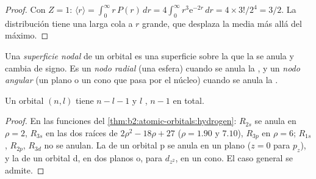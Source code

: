 \begin{proof}
Con $Z = 1$: $\langle r\rangle = \int_0^\infty r\,P(r)\,dr = 4\int_0^\infty r^3\mathrm e^{-2r}
\,dr = 4 \times 3!/2^4 = 3/2$. La distribución tiene una larga cola a $r$ grande,
que desplaza la media más allá del máximo.
\end{proof}

\begin{definition}[Nodos]\label{def:b2:atomic-orbitals:node}
Una \emph{superficie nodal} de un orbital es una superficie sobre la que
la  se anula y cambia de signo. Es un \emph{nodo radial}
(una esfera) cuando se anula la , y un \emph{nodo
angular} (un plano o un cono que pasa por el núcleo) cuando se anula la .
\end{definition}

\begin{proposition}\label{prop:b2:atomic-orbitals:nodes}
Un orbital $(n, l)$ tiene $n - l - 1$  y $l$ , $n - 1$ en
total.
\end{proposition}

\begin{proof}
En las funciones del \cref{thm:b2:atomic-orbitals:hydrogen}: $R_{2s}$ se anula en
$\rho = 2$, $R_{3s}$ en las dos raíces de $2\rho^2 - 18\rho + 27$ ($\rho = 1.90$ y $7.10$),
$R_{3p}$ en $\rho = 6$; $R_{1s}$, $R_{2p}$, $R_{3d}$ no se anulan. La 
de un orbital p se anula en un plano ($z = 0$ para $p_z$), y la de un orbital d, en dos
planos o, para $d_{z^2}$, en un cono. El caso general se admite.
\end{proof}

